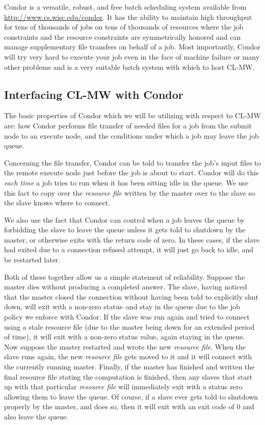 \documentclass[titlepage,12pt]{book}
\newcommand{\xsmall}{\latexhtml{\small}{}}
\newcommand{\xnormalsize}{\latexhtml{\normalsize}{}}
\newcommand{\clmw}{\xsmall\textsc{CL-MW}\xnormalsize\xspace}
\newcommand{\rfile}{\textit{resource file}\xspace}
\begin{document}
Condor is a versatile, robust, and free batch scheduling system
available from \url{http://www.cs.wisc.edu/condor}. It has the ability
to maintain high throughput for tens of thousands of jobs on tens of
thousands of resources where the job constraints and the resource
constraints are symmetrically honored and can manage supplementary
file transfers on behalf of a job. Most importantly, Condor will try
very hard to execute your job even in the face of machine failure or
many other problems and is a very suitable batch system with which
to host \clmw.

\subsection{Interfacing \clmw with Condor}

The basic properties of Condor which we will be utilizing with respect
to \clmw are: how Condor performs file transfer of needed files for
a job from the submit node to an execute node, and the conditions
under which a job may leave the job queue.

Concerning the file transfer, Condor can be told to transfer the
job's input files to the remote execute node just before the job is
about to start.  Condor will do this \emph{each time} a job tries to
run when it has been sitting idle in the queue. We use this fact to
copy over the \rfile written by the master over to the slave so the
slave knows where to connect.

We also use the fact that Condor can control when a job leaves the
queue by forbidding the slave to leave the queue unless it gets told
to shutdown by the master, or otherwise exits with the return code
of zero. In these cases, if the slave had exited due to a connection
refused attempt, it will just go back to idle, and be restarted later.

Both of these together allow us a simple statement of reliability.
Suppose the master dies without producing a completed answer.
The slave, having noticed that the master closed the connection
without having been told to explicitly shut down, will exit with
a non-zero status--and stay in the queue due to the job policy
we enforce with Condor.  If the slave was run again and tried to
connect using a stale resource file (due to the master being down
for an extended period of time), it will exit with a non-zero status
value, again staying in the queue.  Now suppose the master restarted
and wrote the new \rfile.  When the slave runs again, the new \rfile
gets moved to it and it will connect with the currently running master.
Finally, if the master has finished and written the final resource
file stating the computation is finished, then any slaves that start
up with that particular \rfile will immediately exit with a status
zero allowing them to leave the queue. Of course, if a slave ever
gets told to shutdown properly by the master, and does so, then it
will exit with an exit code of 0 and also leave the queue.
\end{document}
